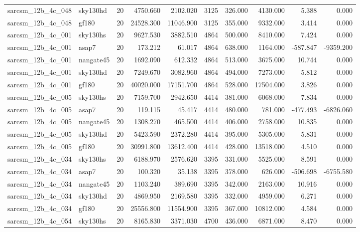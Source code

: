 \begin{longtable}{llrrrrrrrr}
sarcsm\_12b\_4c\_048 & sky130hd & 20 & 4750.660 & 2102.020 & 3125 & 326.000 & 4130.000 & 5.388 & 0.000 \\
sarcsm\_12b\_4c\_048 & gf180 & 20 & 24528.300 & 11046.900 & 3125 & 355.000 & 9332.000 & 3.414 & 0.000 \\
sarcsm\_12b\_4c\_001 & sky130hs & 20 & 9627.530 & 3882.510 & 4864 & 500.000 & 8410.000 & 7.424 & 0.000 \\
sarcsm\_12b\_4c\_001 & asap7 & 20 & 173.212 & 61.017 & 4864 & 638.000 & 1164.000 & -587.847 & -9359.200 \\
sarcsm\_12b\_4c\_001 & nangate45 & 20 & 1692.090 & 612.332 & 4864 & 513.000 & 3675.000 & 10.744 & 0.000 \\
sarcsm\_12b\_4c\_001 & sky130hd & 20 & 7249.670 & 3082.960 & 4864 & 494.000 & 7273.000 & 5.812 & 0.000 \\
sarcsm\_12b\_4c\_001 & gf180 & 20 & 40020.000 & 17151.700 & 4864 & 528.000 & 17504.000 & 3.826 & 0.000 \\
sarcsm\_12b\_4c\_005 & sky130hs & 20 & 7159.700 & 2942.650 & 4414 & 381.000 & 6068.000 & 7.834 & 0.000 \\
sarcsm\_12b\_4c\_005 & asap7 & 20 & 119.115 & 45.417 & 4414 & 480.000 & 781.000 & -477.493 & -6826.060 \\
sarcsm\_12b\_4c\_005 & nangate45 & 20 & 1308.270 & 465.500 & 4414 & 406.000 & 2758.000 & 10.835 & 0.000 \\
sarcsm\_12b\_4c\_005 & sky130hd & 20 & 5423.590 & 2372.280 & 4414 & 395.000 & 5305.000 & 5.831 & 0.000 \\
sarcsm\_12b\_4c\_005 & gf180 & 20 & 30991.800 & 13612.400 & 4414 & 428.000 & 13518.000 & 4.510 & 0.000 \\
sarcsm\_12b\_4c\_034 & sky130hs & 20 & 6188.970 & 2576.620 & 3395 & 331.000 & 5525.000 & 8.591 & 0.000 \\
sarcsm\_12b\_4c\_034 & asap7 & 20 & 100.320 & 35.138 & 3395 & 378.000 & 626.000 & -506.698 & -6755.580 \\
sarcsm\_12b\_4c\_034 & nangate45 & 20 & 1103.240 & 389.690 & 3395 & 342.000 & 2163.000 & 10.916 & 0.000 \\
sarcsm\_12b\_4c\_034 & sky130hd & 20 & 4869.950 & 2169.580 & 3395 & 332.000 & 4959.000 & 6.271 & 0.000 \\
sarcsm\_12b\_4c\_034 & gf180 & 20 & 25556.800 & 11554.900 & 3395 & 367.000 & 10812.000 & 4.584 & 0.000 \\
sarcsm\_12b\_4c\_054 & sky130hs & 20 & 8165.830 & 3371.030 & 4700 & 436.000 & 6871.000 & 8.470 & 0.000 \\

\end{longtable}
